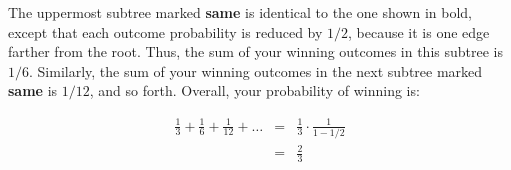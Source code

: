 \documentclass[12pt,twoside]{article}
\begin{document}
\begin{problem}{14}
{The uppermost subtree marked {\bf same} is identical to the one
shown in bold, except that each outcome probability is reduced by
$1/2$, because it is one edge farther from the root.  Thus, the sum of
your winning outcomes in this subtree is $1/6$.  Similarly, the sum of
your winning outcomes in the next subtree marked {\bf same} is $1/12$,
and so forth.  Overall, your probability of winning is:

\begin{eqnarray*}
\frac{1}{3} + \frac{1}{6} + \frac{1}{12} + \ldots
	& = & \frac{1}{3} \cdot \frac{1}{1 - 1/2} \\
	& = & \frac{2}{3}
\end{eqnarray*}
}

\end{problem}
\end{document}

